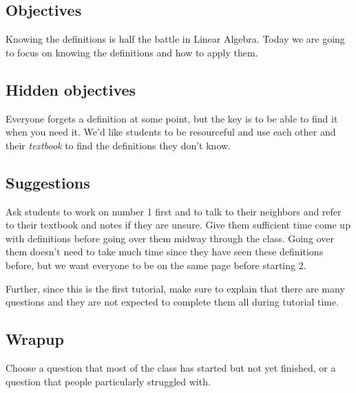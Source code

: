 \documentclass[11pt]{exam}
\begin{document}
\subsection*{Objectives}

	Knowing the definitions is half the battle in Linear Algebra.  Today
	we are going to focus on knowing the definitions and how to apply them.

\subsection*{Hidden objectives}
	
	Everyone forgets a definition at some point, but the key is to be able to
	find it when you need it.  We'd like students to be resourceful and use
	each other and their \emph{textbook} to find the definitions they don't know.

\subsection*{Suggestions}
	Ask students to work on number 1 first and to talk to their neighbors 
	and refer to their textbook and notes if they are unsure.  Give them
	sufficient time come up with definitions before going over them 
	midway through the class.  Going over them doesn't need to take much time
	since they have seen these definitions before, but we want everyone to be
	on the same page before starting 2.

	Further, since this is the first tutorial, make sure to explain that there
	are many questions and they are not expected to complete them all during
	tutorial time.

\subsection*{Wrapup}
	Choose a question that most of the class has started but not yet finished,
	or a question that people particularly struggled with.
\end{document}
